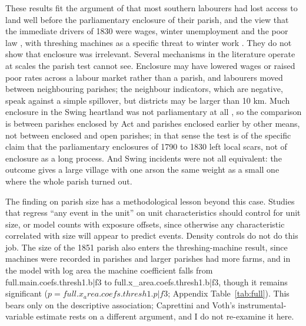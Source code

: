 \documentclass[11pt,a4paper]{article}
\begin{document}
These results fit the argument of \citet{shawtaylor2001} that most southern labourers had lost access to land well before the parliamentary enclosure of their parish, and the view that the immediate drivers of 1830 were wages, winter unemployment and the poor law \citep{snell1985,boyer1990}, with threshing machines as a specific threat to winter work \citep{caprettinivoth2020}. They do not show that enclosure was irrelevant. Several mechanisms in the literature operate at scales the parish test cannot see. Enclosure may have lowered wages or raised poor rates across a labour market rather than a parish, and labourers moved between neighbouring parishes; the neighbour indicators, which are negative, speak against a simple spillover, but districts may be larger than 10 km. Much enclosure in the Swing heartland was not parliamentary at all \citep{wordie1983}, so the comparison is between parishes enclosed by Act and parishes enclosed earlier by other means, not between enclosed and open parishes; in that sense the test is of the specific claim that the parliamentary enclosures of 1790 to 1830 left local scars, not of enclosure as a long process. And Swing incidents were not all equivalent: the outcome gives a large village with one arson the same weight as a small one where the whole parish turned out.

The finding on parish size has a methodological lesson beyond this case. Studies that regress ``any event in the unit'' on unit characteristics should control for unit size, or model counts with exposure offsets, since otherwise any characteristic correlated with size will appear to predict events. Density controls do not do this job. The size of the 1851 parish also enters the threshing-machine result, since machines were recorded in parishes and larger parishes had more farms, and in the model with log area the machine coefficient falls from {{full.main.coefs.thresh1.b|f3}} to {{full.x_area.coefs.thresh1.b|f3}}, though it remains significant ($p={{full.x_area.coefs.thresh1.p|f3}}$; Appendix Table~\ref{tab:full}). This bears only on the descriptive association; Caprettini and Voth's instrumental-variable estimate rests on a different argument, and I do not re-examine it here.
\end{document}
